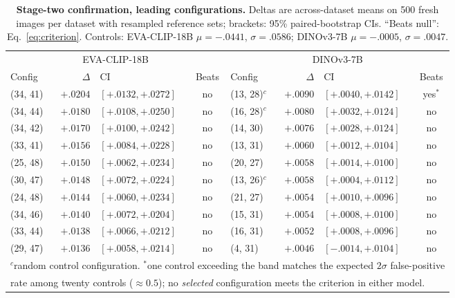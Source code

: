 \documentclass{article}
\newcommand{\eva}{EVA-CLIP-18B}
\newcommand{\dino}{DINOv3-7B}
\begin{document}
\begin{table}[h]
\caption{\textbf{Stage-two confirmation, leading configurations.} Deltas
are across-dataset means on 500 fresh images per dataset with resampled
reference sets; brackets: 95\% paired-bootstrap CIs. ``Beats null'':
Eq.~\ref{eq:criterion}. Controls: \eva{}
$\mu = -.0441$, $\sigma = .0586$; \dino{} $\mu = -.0005$,
$\sigma = .0047$.}
\label{tab:confirm}
\centering
\scriptsize
\begin{tabular}{lrlc@{\hskip 26pt}lrlc}
\toprule
\multicolumn{4}{c}{\eva{}} & \multicolumn{4}{c}{\dino{}} \\
\cmidrule(r{22pt}){1-4} \cmidrule(l){5-8}
Config & $\Delta$ & CI & Beats & Config & $\Delta$ & CI & Beats \\
\midrule
(34, 41) & $+.0204$ & $[+.0132, +.0272]$ & no & (13, 28)$^{c}$ & $+.0090$ & $[+.0040, +.0142]$ & yes$^{*}$ \\
(34, 44) & $+.0180$ & $[+.0108, +.0250]$ & no & (16, 28)$^{c}$ & $+.0080$ & $[+.0032, +.0124]$ & no \\
(34, 42) & $+.0170$ & $[+.0100, +.0242]$ & no & (14, 30) & $+.0076$ & $[+.0028, +.0124]$ & no \\
(33, 41) & $+.0156$ & $[+.0084, +.0228]$ & no & (13, 31) & $+.0060$ & $[+.0012, +.0104]$ & no \\
(25, 48) & $+.0150$ & $[+.0062, +.0234]$ & no & (20, 27) & $+.0058$ & $[+.0014, +.0100]$ & no \\
(30, 47) & $+.0148$ & $[+.0072, +.0224]$ & no & (13, 26)$^{c}$ & $+.0058$ & $[+.0004, +.0112]$ & no \\
(24, 48) & $+.0144$ & $[+.0060, +.0234]$ & no & (21, 27) & $+.0054$ & $[+.0010, +.0096]$ & no \\
(34, 46) & $+.0140$ & $[+.0072, +.0204]$ & no & (15, 31) & $+.0054$ & $[+.0008, +.0100]$ & no \\
(33, 44) & $+.0138$ & $[+.0066, +.0212]$ & no & (16, 31) & $+.0052$ & $[+.0008, +.0096]$ & no \\
(29, 47) & $+.0136$ & $[+.0058, +.0214]$ & no & (4, 31) & $+.0046$ & $[-.0014, +.0104]$ & no \\
\bottomrule
\multicolumn{8}{l}{$^{c}$random control configuration. $^{*}$one
control exceeding the band matches the expected $2\sigma$ false-positive}\\
\multicolumn{8}{l}{rate among twenty controls ($\approx 0.5$); no
\emph{selected} configuration meets the criterion in either model.}
\end{tabular}
\label{app:confirmtables}
\end{table}
\end{document}
